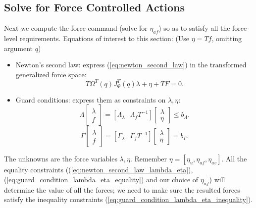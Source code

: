 \subsection{Solve for Force Controlled Actions} %
\label{sub:solve_for_force_controlled_actions}
Next we compute the force command (solve for $\eta_{af}$) so as to satisfy all the force-level requirements.
Equations of interest to this section:
(Use $\eta=Tf$, omitting argument $q$)
\begin{itemize}
  \item Newton's second law: express (\ref{eq:newton_second_law}) in the transformed generalized force space:
    \begin{equation}
      \label{eq:newton_second_law_lambda_eta}
      T\Omega^T(q)J^T_\Phi(q)\lambda + \eta + TF = 0.
    \end{equation}
  \item Guard conditions: express them as constraints on $\lambda, \eta$:
    \begin{equation}
      \label{eq:guard_condition_lambda_eta_inequality}
      \Lambda\left[ {\begin{array}{*{20}{c}}\lambda \\f\end{array}} \right] = [{\Lambda_\lambda }\;\;\,{\Lambda_f}{T^{ - 1}}]\left[ {\begin{array}{*{20}{c}}\lambda \\\eta \end{array}} \right] \le {b_\Lambda}.
    \end{equation}
    \begin{equation}
      \label{eq:guard_condition_lambda_eta_equality}
      \Gamma\left[ {\begin{array}{*{20}{c}}\lambda \\f\end{array}} \right] = [{\Gamma_\lambda }\;\;\,{\Gamma_f}{T^{ - 1}}]\left[ {\begin{array}{*{20}{c}}\lambda \\\eta \end{array}} \right] = {b_\Gamma}.
    \end{equation}
\end{itemize}
The unknowns are the force variables $\lambda, \eta$. Remember $\eta=[\eta_u, \eta_{af}, \eta_{av}]$. All the equality constraints ((\ref{eq:newton_second_law_lambda_eta}), (\ref{eq:guard_condition_lambda_eta_equality}) and our choice of $\eta_{af}$) will determine the value of all the forces; we need to make sure the resulted forces satisfy the inequality constraints (\ref{eq:guard_condition_lambda_eta_inequality}).
